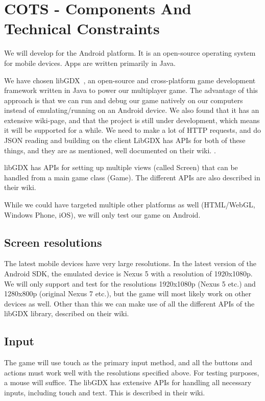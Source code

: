 \section{COTS - Components And Technical Constraints}
We will develop for the Android platform. It is an open-source operating system for mobile devices. Apps are written primarily in Java. 

We have chosen libGDX~\cite{libgdx}, an open-source and cross-platform game development framework written in Java to power our multiplayer game. The advantage of this approach is that we can run and debug our game natively on our computers instead of emulating/running on an Android device. We also found that it has an extensive wiki-page\cite{libgdx-wiki}, and that the project is still under development, which means it will be supported for a while. We need to make a lot of HTTP requests, and do JSON reading and building on the client LibGDX has APIs for both of these things, and they are as mentioned, well documented on their wiki. \cite{libgdx-wiki-json}. \cite{libgdx-wiki-networking} 

libGDX has APIs for setting up multiple views (called Screen) that can be handled from a main game class (Game). The different APIs are  also described in their wiki. \cite{libgdx-wiki-game}\cite{libgdx-wiki-graphics}

While we could have targeted multiple other platforms as well (HTML/WebGL, Windows Phone, iOS), we will only test our game on Android.

\subsection{Screen resolutions}
The latest mobile devices have very large resolutions. In the latest version of the Android SDK, the emulated device is Nexus 5 with a resolution of 1920x1080p. We will only support and test for the resolutions 1920x1080p (Nexus 5 etc.) and 1280x800p (original Nexus 7 etc.), but the game will most likely work on other devices as well. Other than this we can make use of all the different APIs of the libGDX library, described on their wiki. \cite{libgdx-wiki-graphics}

\subsection{Input}
The game will use touch as the primary input method, and all the buttons and actions must work well with the resolutions specified above. For testing purposes, a mouse will suffice. The libGDX has extensive APIs for handling all necessary inputs, including touch and text. This is described in their wiki. \cite{libgdx-wiki-input}

